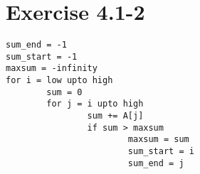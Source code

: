 \documentclass{article}
\begin{document}
\section*{Exercise 4.1-2}

\begin{verbatim}
sum_end = -1
sum_start = -1
maxsum = -infinity
for i = low upto high
        sum = 0
        for j = i upto high
                sum += A[j]
                if sum > maxsum
                        maxsum = sum
                        sum_start = i
                        sum_end = j
\end{verbatim}
\end{document}
